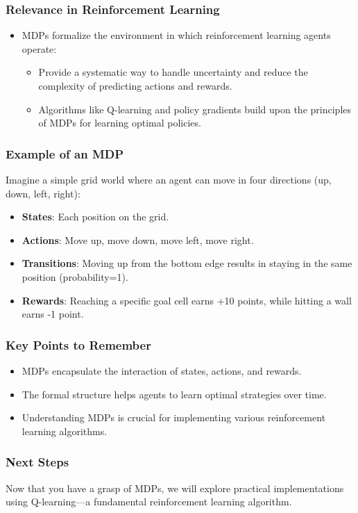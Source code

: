 \documentclass[aspectratio=169]{beamer}
\begin{document}
\begin{frame}[fragile]
    \frametitle{Relevance in Reinforcement Learning}
    \begin{itemize}
        \item MDPs formalize the environment in which reinforcement learning agents operate:
        \begin{itemize}
            \item Provide a systematic way to handle uncertainty and reduce the complexity of predicting actions and rewards.
            \item Algorithms like Q-learning and policy gradients build upon the principles of MDPs for learning optimal policies.
        \end{itemize}
    \end{itemize}
\end{frame}

\begin{frame}[fragile]
    \frametitle{Example of an MDP}
    Imagine a simple grid world where an agent can move in four directions (up, down, left, right):
    \begin{itemize}
        \item \textbf{States}: Each position on the grid.
        \item \textbf{Actions}: Move up, move down, move left, move right.
        \item \textbf{Transitions}: Moving up from the bottom edge results in staying in the same position (probability=1).
        \item \textbf{Rewards}: Reaching a specific goal cell earns +10 points, while hitting a wall earns -1 point.
    \end{itemize}
\end{frame}

\begin{frame}[fragile]
    \frametitle{Key Points to Remember}
    \begin{itemize}
        \item MDPs encapsulate the interaction of states, actions, and rewards.
        \item The formal structure helps agents to learn optimal strategies over time.
        \item Understanding MDPs is crucial for implementing various reinforcement learning algorithms.
    \end{itemize}
\end{frame}

\begin{frame}[fragile]
    \frametitle{Next Steps}
    Now that you have a grasp of MDPs, we will explore practical implementations using Q-learning—a fundamental reinforcement learning algorithm. 
\end{frame}
\end{document}
